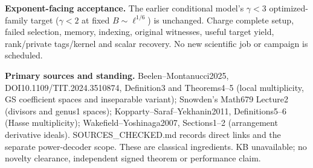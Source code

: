 \documentclass[10pt]{article}
\begin{document}
\textbf{Exponent-facing acceptance.}
The earlier conditional model's $\gamma<3$ optimized-family target
($\gamma<2$ at fixed $B\sim\ell^{1/6}$) is unchanged. Charge complete
setup, failed selection, memory, indexing, original witnesses, useful
target yield, rank/private tags/kernel and scalar recovery. No new
scientific job or campaign is scheduled.

\textbf{Primary sources and standing.}
Beelen--Montanucci2025, DOI10.1109/TIT.2024.3510874, Definition3 and
Theorems4--5 (local multiplicity, GS coefficient spaces and inseparable
variant); Snowden's Math679 Lecture2 (divisors and genus1 spaces);
Kopparty--Saraf--Yekhanin2011, Definitions5--6 (Hasse multiplicity);
Wakefield--Yoshinaga2007, Sections1--2 (arrangement derivative ideals).
SOURCES\_CHECKED.md records direct links and the separate power-decoder
scope. These are classical ingredients. KB unavailable; no novelty
clearance, independent signed theorem or performance claim.
\end{document}
